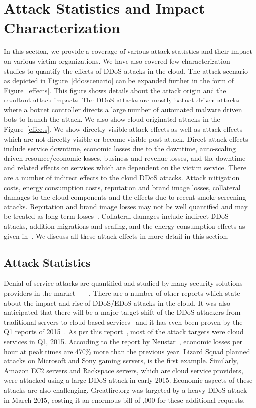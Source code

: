 \documentclass[final,5p,times,twocolumn]{elsarticle}
\begin{document}
\section{Attack Statistics and Impact Characterization}
\label{AttackStatistics}
In this section, we provide a coverage of various attack statistics and their impact on various victim organizations. We have also covered few characterization studies to quantify the effects of DDoS attacks in the cloud. {The attack scenario as depicted in Figure~\ref{ddosscenario} can be expanded further in the form of Figure~\ref{effects}. This figure shows details about the attack origin and the resultant attack impacts. The DDoS attacks are mostly botnet driven attacks where a botnet controller directs a large number of automated malware driven bots to launch the attack. We also show cloud originated attacks in the Figure~\ref{effects}. We show directly visible attack effects as well as attack effects which are not directly visible or become visible post-attack. Direct attack effects include service downtime, economic losses due to the downtime, auto-scaling driven resource/economic losses, business and revenue losses, and the downtime and related effects on services which are dependent on the victim service. There are a number of indirect effects to the cloud DDoS attacks. Attack mitigation costs, energy consumption costs, reputation and brand image losses, collateral damages to the cloud components and the effects due to recent smoke-screening attacks. Reputation and brand image losses may not be well quantified and may be treated as long-term losses~\cite{conversion}. Collateral damages include indirect DDoS attacks, addition migrations and scaling, and the energy consumption effects as given in~\cite{somani2016ddos}. We discuss all these attack effects in more detail in this section. }

\subsection{Attack Statistics}
Denial of service attacks are quantified and studied by many security solutions providers in the market~\cite{Akamai}~\cite{neustar}~\cite{prolexic}~\cite{arbor}. There are a number of other reports which state about the impact and rise of DDoS/EDoS attacks in the cloud. It was also anticipated that there will be a major target shift of the DDoS attackers from traditional servers to cloud-based services~\cite{cloudddosnews} and it has even been proven by the Q1 reports of 2015~\cite{2015targetingcloud}. As per this report~\cite{2015targetingcloud}, most of the attack targets were cloud services in Q1, 2015. According to the report by Neustar~\cite{economiclosses}, economic losses per hour at peak times are 470\% more than the previous year. Lizard Squad planned attacks on Microsoft and Sony gaming servers, is the first example. Similarly, Amazon EC2 servers and Rackspace servers, which are cloud service providers, were attacked using a large DDoS attack in early 2015. Economic aspects of these attacks are also challenging. Greatfire.org was targeted by a heavy DDoS attack in March 2015, costing it an enormous bill of ,000 for these additional requests. 
\end{document}
